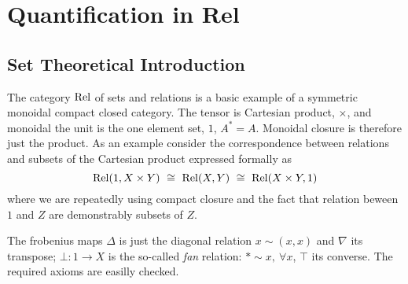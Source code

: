 \section{Quantification in Rel}
\subsection{Set Theoretical Introduction}


The category $\mathrm{Rel}$ of sets and relations is a basic example of a
symmetric monoidal compact closed category. The tensor is Cartesian
product, $\times$, and monoidal the unit is the one element set,
$1$, $A^\ast = A$. 
Monoidal closure is therefore just the product. 
As an example consider the correspondence between relations and subsets of
the Cartesian product expressed formally as
\[
\mathrm{Rel}(1, X \times Y) ~\cong~\mathrm{Rel}(X,Y)~\cong~\mathrm{Rel}(X\times Y , 1)\]
%
where we are repeatedly using compact closure and the fact that
relation beween $1$ and $Z$ are demonstrably subsets of $Z$. 


The frobenius maps $\Delta$ is just 
the diagonal relation $x \sim (x,x)$ and $\nabla$ its transpose; $\bot : 1
\to X$ is the so-called \emph{fan} relation: $\ast \sim x, ~  \forall
x$, $\top$ its converse. The required axioms are easilly checked. 


